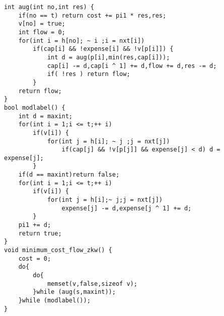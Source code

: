 \begin{lstlisting}
int aug(int no,int res) {
    if(no == t) return cost += pi1 * res,res;
    v[no] = true;
    int flow = 0;
    for(int i = h[no]; ~ i ;i = nxt[i])
		if(cap[i] && !expense[i] && !v[p[i]]) {
			int d = aug(p[i],min(res,cap[i]));
			cap[i] -= d,cap[i ^ 1] += d,flow += d,res -= d;
			if( !res ) return flow;
		}
    return flow;
}
bool modlabel() {
    int d = maxint;
    for(int i = 1;i <= t;++ i)
		if(v[i]) {
			for(int j = h[i]; ~ j ;j = nxt[j])
				if(cap[j] && !v[p[j]] && expense[j] < d) d = expense[j];
		}
    if(d == maxint)return false;
    for(int i = 1;i <= t;++ i)
		if(v[i]) {
			for(int j = h[i];~ j;j = nxt[j])
				expense[j] -= d,expense[j ^ 1] += d;
		}
    pi1 += d;
    return true;
}
void minimum_cost_flow_zkw() {
	cost = 0;
	do{
		do{
			memset(v,false,sizeof v);
		}while (aug(s,maxint));
	}while (modlabel());
}
\end{lstlisting}
